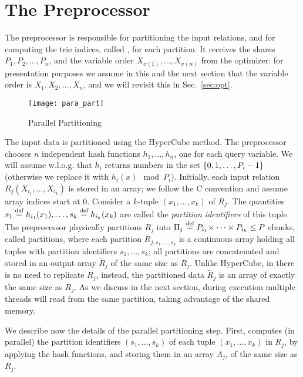 \section{The Preprocessor} \label{sec:prep}

The preprocessor is responsible for partitioning the input relations,
and for computing the trie indices, called \indexlayout, for each
partition.  It receives the shares $P_1, P_2, \ldots, P_n$, and the
variable order $X_{\sigma(1)}, \ldots, X_{\sigma(n)}$ from the optimizer; for presentation
purposes we assume in this and the next section that the variable
order is $X_1, X_2, \ldots, X_n$, and we will revisit this in
Sec.~\ref{sec:opt}.

\begin{figure}[t]
  \centering
  \texttt{[image: para\_part]}
  \caption{Parallel Partitioning}
  \label{fig:parapart}
\end{figure}

The input data is partitioned using the HyperCube method.  The
preprocessor chooses $n$ independent hash functions
$h_1, \ldots, h_n$, one for each query variable.  We will assume
w.l.o.g. that $h_i$ returns numbers in the set
$\{0,1,\ldots,P_i-1\}$ (otherwise we replace it with
$h_i(x) \mod P_i$).  Initially, each input relation
$R_j(X_{i_1},\ldots,X_{i_k})$ is stored in an array; we follow the C
convention and assume array indices start at 0.  Consider a $k$-tuple
$(x_1, \ldots, x_k)$ of $R_j$.  The quantities
$s_1 \stackrel{\text{def}}{=} h_{i_1}(x_1), \ldots, s_k \stackrel{\text{def}}{=} h_{i_k}(x_k)$ are called
the {\em partition identifiers} of this tuple.  The preprocessor
physically partitions $R_j$ into
$\Pi_j \stackrel{\text{def}}{=} P_{i_1} \! \times \cdots \times  P_{i_k} \leq P$ chunks, called partitions,
where each partition $R_{j,s_1,\ldots,s_k}$ is a continuous array
holding all tuples with partition identifiers $s_1, \ldots, s_k$; all
partitions are concatenated and stored in an output array $\tilde R_j$
of the same size as $R_j$.  Unlike HyperCube, in \name there is no
need to replicate $R_j$, instead, the partitioned data $\tilde R_j$ is
an array of exactly the same size as $R_j$.  As we discuss in the next
section, during execution multiple threads will read from the same
partition, taking advantage of the shared memory.

  

We describe now the details of the parallel partitioning step.  First,
\name computes (in parallel) the partition identifiers
$(s_1,\ldots, s_k)$ of each tuple $(x_1, \ldots, x_k)$ in $R_j$, by
applying the hash functions, and storing them in an array $A_j$, of the
same size as $R_j$.  

